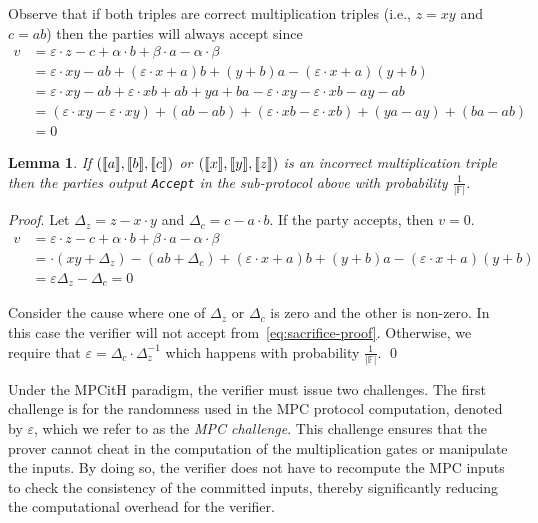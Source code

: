 \documentclass[11pt]{report}
\theoremstyle{definition}
\theoremstyle{plain}
\newtheorem{lemma}{Lemma}[section]
\begin{document}
Observe that if both triples are correct multiplication triples (i.e., $z = xy$ and $c = ab$) then the parties will always accept since
\begin{align*}
  v & = \varepsilon \cdot z - c + \alpha \cdot b + \beta \cdot a - \alpha \cdot \beta                                                     \\
    & = \varepsilon \cdot xy - ab + (\varepsilon \cdot x + a)b + (y + b)a - (\varepsilon \cdot x + a)(y + b)                              \\
    & = \varepsilon \cdot xy - ab + \varepsilon \cdot xb + ab + ya + ba - \varepsilon \cdot xy - \varepsilon \cdot xb - ay - ab           \\
    & = (\varepsilon \cdot xy - \varepsilon \cdot xy) + (ab - ab) + (\varepsilon \cdot xb - \varepsilon \cdot xb) + (ya - ay) + (ba - ab) \\
    & = 0
\end{align*}

\begin{lemma}\label{lem:sacrifice_soundness}
  If $(\llbracket a \rrbracket, \llbracket b \rrbracket, \llbracket c \rrbracket)$ or $(\llbracket x \rrbracket, \llbracket y \rrbracket, \llbracket z \rrbracket)$ is an incorrect multiplication triple then the parties output \texttt{Accept} in the sub-protocol above with probability $\frac{1}{|\mathbb{F}|}$.
\end{lemma}

\textit{Proof}. Let $\Delta_z = z - x \cdot y$ and $\Delta_c = c - a \cdot b$. If the party accepts, then $v = 0$.
\begin{align}
  v & = \varepsilon \cdot z - c + \alpha \cdot b + \beta \cdot a - \alpha \cdot \beta                           \nonumber             \\
    & = \cdot (xy + \Delta_z ) - (ab + \Delta_c) + (\varepsilon \cdot x + a)b + (y + b)a - (\varepsilon \cdot x + a)(y + b) \nonumber \\
    & = \varepsilon\Delta_z - \Delta_c = 0 \label{eq:sacrifice-proof}
\end{align}

Consider the cause where one of $\Delta_z$ or $\Delta_c$ is zero and the other is non-zero. In this case the verifier will not accept from~\ref{eq:sacrifice-proof}. Otherwise, we require that $\varepsilon = \Delta_c \cdot \Delta_z^{-1}$ which happens with probability $\frac{1}{|\mathbb{F}|}$. \qed

Under the MPCitH paradigm, the verifier must issue two challenges. The first challenge is for the randomness used in the MPC protocol computation, denoted by $\varepsilon$, which we refer to as the \textit{MPC challenge}. This challenge ensures that the prover cannot cheat in the computation of the multiplication gates or manipulate the inputs. By doing so, the verifier does not have to recompute the MPC inputs to check the consistency of the committed inputs, thereby significantly reducing the computational overhead for the verifier.
\end{document}
